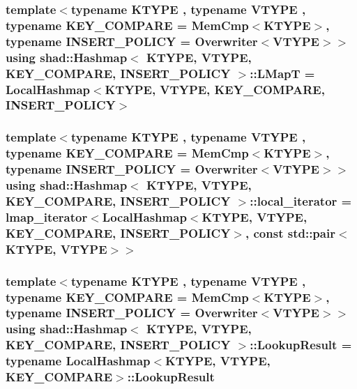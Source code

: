 \hypertarget{classshad_1_1Hashmap_aace37116c38330a70352a3081d0ec07e}{
\subsubsection[{L\-Map\-T}]{\setlength{\rightskip}{0pt plus 5cm}template$<$typename K\-T\-Y\-P\-E , typename V\-T\-Y\-P\-E , typename K\-E\-Y\-\_\-\-C\-O\-M\-P\-A\-R\-E  = Mem\-Cmp$<$\-K\-T\-Y\-P\-E$>$, typename I\-N\-S\-E\-R\-T\-\_\-\-P\-O\-L\-I\-C\-Y  = Overwriter$<$\-V\-T\-Y\-P\-E$>$$>$ using {\bf shad\-::\-Hashmap}$<$ K\-T\-Y\-P\-E, V\-T\-Y\-P\-E, K\-E\-Y\-\_\-\-C\-O\-M\-P\-A\-R\-E, I\-N\-S\-E\-R\-T\-\_\-\-P\-O\-L\-I\-C\-Y $>$\-::{\bf L\-Map\-T} =  {\bf Local\-Hashmap}$<$K\-T\-Y\-P\-E, V\-T\-Y\-P\-E, K\-E\-Y\-\_\-\-C\-O\-M\-P\-A\-R\-E, I\-N\-S\-E\-R\-T\-\_\-\-P\-O\-L\-I\-C\-Y$>$}}\label{classshad_1_1Hashmap_aace37116c38330a70352a3081d0ec07e}
\hypertarget{classshad_1_1Hashmap_a64f114b7ab44339efad138ec0c72b052}{
\subsubsection[{local\-\_\-iterator}]{\setlength{\rightskip}{0pt plus 5cm}template$<$typename K\-T\-Y\-P\-E , typename V\-T\-Y\-P\-E , typename K\-E\-Y\-\_\-\-C\-O\-M\-P\-A\-R\-E  = Mem\-Cmp$<$\-K\-T\-Y\-P\-E$>$, typename I\-N\-S\-E\-R\-T\-\_\-\-P\-O\-L\-I\-C\-Y  = Overwriter$<$\-V\-T\-Y\-P\-E$>$$>$ using {\bf shad\-::\-Hashmap}$<$ K\-T\-Y\-P\-E, V\-T\-Y\-P\-E, K\-E\-Y\-\_\-\-C\-O\-M\-P\-A\-R\-E, I\-N\-S\-E\-R\-T\-\_\-\-P\-O\-L\-I\-C\-Y $>$\-::{\bf local\-\_\-iterator} =  {\bf lmap\-\_\-iterator}$<${\bf Local\-Hashmap}$<$K\-T\-Y\-P\-E, V\-T\-Y\-P\-E, K\-E\-Y\-\_\-\-C\-O\-M\-P\-A\-R\-E, I\-N\-S\-E\-R\-T\-\_\-\-P\-O\-L\-I\-C\-Y$>$, const std\-::pair$<$K\-T\-Y\-P\-E, V\-T\-Y\-P\-E$>$$>$}}\label{classshad_1_1Hashmap_a64f114b7ab44339efad138ec0c72b052}
\hypertarget{classshad_1_1Hashmap_acc8ac68502c6c886d18d660e907fef0a}{
\subsubsection[{Lookup\-Result}]{\setlength{\rightskip}{0pt plus 5cm}template$<$typename K\-T\-Y\-P\-E , typename V\-T\-Y\-P\-E , typename K\-E\-Y\-\_\-\-C\-O\-M\-P\-A\-R\-E  = Mem\-Cmp$<$\-K\-T\-Y\-P\-E$>$, typename I\-N\-S\-E\-R\-T\-\_\-\-P\-O\-L\-I\-C\-Y  = Overwriter$<$\-V\-T\-Y\-P\-E$>$$>$ using {\bf shad\-::\-Hashmap}$<$ K\-T\-Y\-P\-E, V\-T\-Y\-P\-E, K\-E\-Y\-\_\-\-C\-O\-M\-P\-A\-R\-E, I\-N\-S\-E\-R\-T\-\_\-\-P\-O\-L\-I\-C\-Y $>$\-::{\bf Lookup\-Result} =  typename {\bf Local\-Hashmap}$<$K\-T\-Y\-P\-E, V\-T\-Y\-P\-E, K\-E\-Y\-\_\-\-C\-O\-M\-P\-A\-R\-E$>$\-::{\bf Lookup\-Result}}}\label{classshad_1_1Hashmap_acc8ac68502c6c886d18d660e907fef0a}
